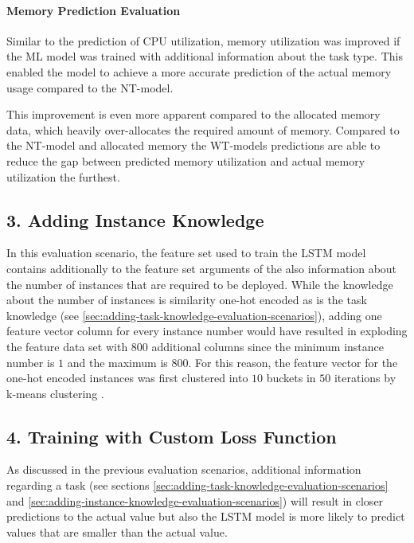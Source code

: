     \paragraph{Memory Prediction Evaluation}
    \label{par:memory-prediction-evaluation-task-knowledge}

      Similar to the prediction of CPU utilization, memory utilization was improved if the ML model was trained with additional information about the task type. This enabled the model to achieve a more accurate prediction of the actual memory usage compared to the NT-model.

      This improvement is even more apparent compared to the allocated memory data, which heavily over-allocates the required amount of memory. Compared to the NT-model and allocated memory the WT-models predictions are able to reduce the gap between predicted memory utilization and actual memory utilization the furthest.

  \subsection*{3. Adding Instance Knowledge}
  \label{sec:adding-instance-knowledge-evaluation-scenarios}

    In this evaluation scenario, the feature set used to train the LSTM model contains additionally to the feature set arguments of the  also information about the number of instances that are required to be deployed. While the knowledge about the number of instances is similarity one-hot encoded as is the task knowledge (see \ref{sec:adding-task-knowledge-evaluation-scenarios}), adding one feature vector column for every instance number would have resulted in exploding the feature data set with 800 additional columns since the minimum instance number is $1$ and the maximum is $800$.
    For this reason, the feature vector for the one-hot encoded instances was first clustered into $10$ buckets in $50$ iterations by k-means clustering \cite{hartiganAlgorithm136Kmeans1979}.

  \subsection*{4. Training with Custom Loss Function}
  \label{sec:training-with-custom-loss-function-evaluation-scenarios}

      As discussed in the previous evaluation scenarios, 
      additional information regarding a task (see sections \ref{sec:adding-task-knowledge-evaluation-scenarios} and \ref{sec:adding-instance-knowledge-evaluation-scenarios}) will result in closer predictions to the actual value but also the LSTM model is more likely to predict values that are smaller than the actual value.
      
